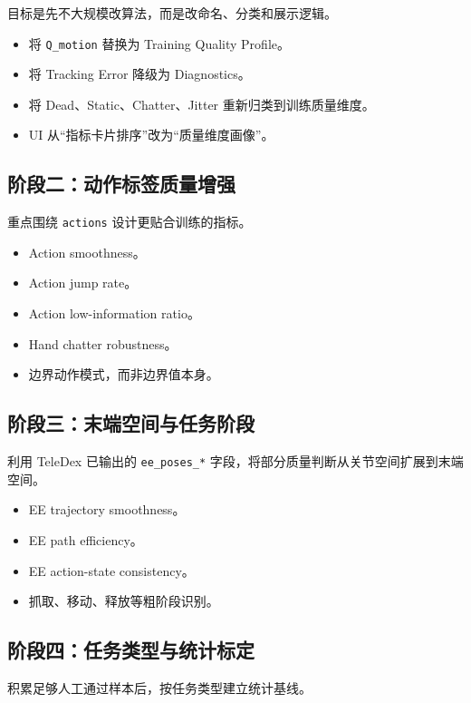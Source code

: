 \documentclass[UTF8,zihao=-4,oneside,openany]{ctexrep}
\begin{document}
目标是先不大规模改算法，而是改命名、分类和展示逻辑。

\begin{itemize}
  \item 将 \texttt{Q\_motion} 替换为 Training Quality Profile。
  \item 将 Tracking Error 降级为 Diagnostics。
  \item 将 Dead、Static、Chatter、Jitter 重新归类到训练质量维度。
  \item UI 从“指标卡片排序”改为“质量维度画像”。
\end{itemize}

\subsection{阶段二：动作标签质量增强}

重点围绕 \texttt{actions} 设计更贴合训练的指标。

\begin{itemize}
  \item Action smoothness。
  \item Action jump rate。
  \item Action low-information ratio。
  \item Hand chatter robustness。
  \item 边界动作模式，而非边界值本身。
\end{itemize}

\subsection{阶段三：末端空间与任务阶段}

利用 TeleDex 已输出的 \texttt{ee\_poses\_*} 字段，将部分质量判断从关节空间扩展到末端空间。

\begin{itemize}
  \item EE trajectory smoothness。
  \item EE path efficiency。
  \item EE action-state consistency。
  \item 抓取、移动、释放等粗阶段识别。
\end{itemize}

\subsection{阶段四：任务类型与统计标定}

积累足够人工通过样本后，按任务类型建立统计基线。
\end{document}
